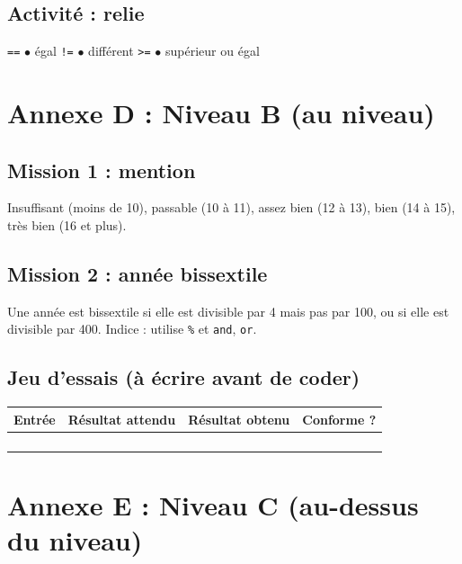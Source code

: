 \documentclass[11pt,a4paper]{article}
\begin{document}
\subsection*{Activité : relie}
\texttt{==} \quad $\bullet$ \quad égal \qquad \texttt{!=} \quad $\bullet$ \quad différent \qquad \texttt{>=} \quad $\bullet$ \quad supérieur ou égal

\newpage
\section*{Annexe D : Niveau B (au niveau)}

\subsection*{Mission 1 : mention}
Insuffisant (moins de 10), passable (10 à 11), assez bien (12 à 13), bien (14 à 15), très bien (16 et plus).

\subsection*{Mission 2 : année bissextile}
Une année est bissextile si elle est divisible par 4 mais pas par 100, ou si elle est divisible par 400. Indice : utilise \texttt{\%} et \texttt{and}, \texttt{or}.

\subsection*{Jeu d'essais (à écrire avant de coder)}
\begin{tabularx}{\linewidth}{>{\bfseries}p{3cm}Y Y Y}
\toprule
Entrée & Résultat attendu & Résultat obtenu & Conforme ?\\
\midrule
 & & & \\ & & & \\ & & & \\ & & & \\
\bottomrule
\end{tabularx}

\newpage
\section*{Annexe E : Niveau C (au-dessus du niveau)}
\end{document}
